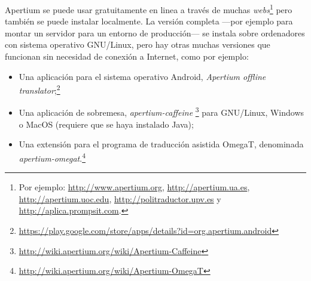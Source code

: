 Apertium se puede usar gratuitamente en linea a través de muchas \emph{webs}\footnote{Por ejemplo: \url{http://www.apertium.org}, \url{http://apertium.ua.es}, \url{http://apertium.uoc.edu}, \url{http://politraductor.upv.es} y \url{http://aplica.prompsit.com}.}  pero también se puede instalar localmente. La versión completa ---por ejemplo para montar un servidor para un entorno de producción--- se instala sobre ordenadores con sistema operativo GNU/Linux, pero hay otras muchas versiones que funcionan sin necesidad de conexión a Internet, como por ejemplo: \begin{itemize} \item Una aplicación para el sistema operativo Android, \emph{Apertium offline translator};\footnote{\url{https://play.google.com/store/apps/details?id=org.apertium.android}} \item Una aplicación de sobremesa, \emph{apertium-caffeine} \footnote{\url{http://wiki.apertium.org/wiki/Apertium-Caffeine}} para GNU/Linux, Windows o MacOS (requiere que se haya instalado Java); \item Una extensión para el programa de traducción asistida OmegaT, denominada \emph{apertium-omegat}.\footnote{\url{http://wiki.apertium.org/wiki/Apertium-OmegaT}} \end{itemize} 

